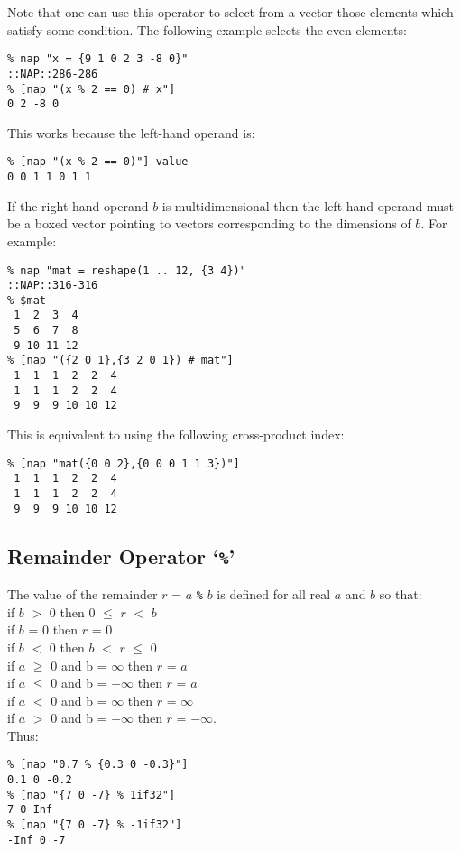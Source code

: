  Note that one can use this operator to select from a vector those
  elements which satisfy some condition. The following example selects
  the even elements:
  \begin{verbatim}
% nap "x = {9 1 0 2 3 -8 0}"
::NAP::286-286
% [nap "(x % 2 == 0) # x"]
0 2 -8 0
\end{verbatim}

  
 This works because the left-hand operand is:
  \begin{verbatim}
% [nap "(x % 2 == 0)"] value
0 0 1 1 0 1 1
\end{verbatim}
  
If the right-hand operand $b$ is multidimensional then the left-hand operand must be a
boxed vector pointing to vectors corresponding to the dimensions of $b$.
For example:
  \begin{verbatim}
% nap "mat = reshape(1 .. 12, {3 4})"
::NAP::316-316
% $mat
 1  2  3  4
 5  6  7  8
 9 10 11 12
% [nap "({2 0 1},{3 2 0 1}) # mat"]
 1  1  1  2  2  4
 1  1  1  2  2  4
 9  9  9 10 10 12
\end{verbatim}

  
 This is equivalent to using the following cross-product index:
  \begin{verbatim}
% [nap "mat({0 0 2},{0 0 0 1 1 3})"]
 1  1  1  2  2  4
 1  1  1  2  2  4
 9  9  9 10 10 12
\end{verbatim}

\subsection{Remainder Operator `\texttt{\%}'}
    \label{op-Remainder}

The value of the remainder 
  $r$ = 
  $a$ 
  \texttt{\%} 
  $b$ is defined for all real 
  $a$ and 
  $b$ so that:
  \\if 
  $b$ $>$ 0 then 0 $\le$ 
  $r$ $<$ 
  $b$
  \\if 
  $b$ = 0 then 
  $r$ = 0
  \\if 
  $b$ $<$ 0 then 
  $b$ $<$ 
  $r$ $\le$ 0
  \\if 
  $a$ $\ge$ 0 and b = $\infty$ then 
  $r$ = 
  $a$
  \\if 
  $a$ $\le$ 0 and b = $-$$\infty$ then 
  $r$ = 
  $a$
  \\if 
  $a$ $<$ 0 and b = $\infty$ then 
  $r$ = $\infty$
  \\if 
  $a$ $>$ 0 and b = $-$$\infty$ then 
  $r$ = $-$$\infty$.
  \\Thus:
  \begin{verbatim}
% [nap "0.7 % {0.3 0 -0.3}"]
0.1 0 -0.2
% [nap "{7 0 -7} % 1if32"]
7 0 Inf
% [nap "{7 0 -7} % -1if32"]
-Inf 0 -7
\end{verbatim}

